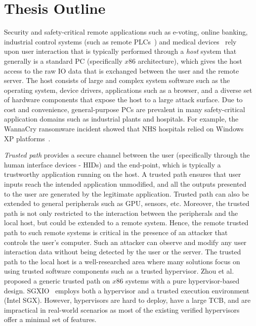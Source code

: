 \section{Thesis Outline}

Security and safety-critical remote applications such as e-voting, online banking, industrial control systems (such as remote PLCs~\cite{controlbyweb}) and medical devices~\cite{medicalDevice} rely upon user interaction that is typically performed through a \emph{host} system that generally is a standard PC (specifically $x86$ architecture), which gives the host access to the raw IO data that is exchanged between the user and the remote server. The host consists of large and complex system software such as the operating system, device drivers, applications such as a browser, and a diverse set of hardware components that expose the host to a large attack surface. Due to cost and convenience, general-purpose PCs are prevalent in many safety-critical application domains such as industrial plants and hospitals. For example, the WannaCry ransomware incident showed that NHS hospitals relied on Windows XP platforms~\cite{berry_2017,field_wannacry_2018}. 


\emph{Trusted path} provides a secure channel between the user (specifically through the human interface devices - HIDs) and the end-point, which is typically a trustworthy application running on the host. A trusted path ensures that user inputs reach the intended application unmodified, and all the outputs presented to the user are generated by the legitimate application. Trusted path can also be extended to general peripherals such as GPU, sensors, etc. Moreover, the trusted path is not only restricted to the interaction between the peripherals and the local host, but could be extended to a remote system. Hence, the remote trusted path to such remote systems is critical in the presence of an attacker that controls the user's computer. Such an attacker can observe and modify any user interaction data without being detected by the user or the server. The trusted path to the local host is a well-researched area where many solutions focus on using trusted software components such as a trusted hypervisor. Zhou et al.~\cite{zhou2012building} proposed a generic trusted path on $x86$ systems with a pure hypervisor-based design. SGXIO~\cite{weiser2017sgxio} employs both a hypervisor and a trusted execution environment (Intel SGX). However, hypervisors are hard to deploy, have a large TCB, and are impractical in real-world scenarios as most of the existing verified hypervisors offer a minimal set of features.  


